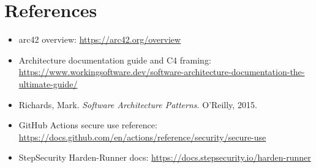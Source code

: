 \documentclass[10pt, a4paper]{article}
\begin{document}
\section*{References}

\begin{itemize}
  \item arc42 overview: \url{https://arc42.org/overview}

  \item Architecture documentation guide and C4 framing:\\
        \url{https://www.workingsoftware.dev/software-architecture-documentation-the-ultimate-guide/}

  \item Richards, Mark. \textit{Software Architecture Patterns}. O'Reilly, 2015.

  \item GitHub Actions secure use reference:\\
        \url{https://docs.github.com/en/actions/reference/security/secure-use}


  \item StepSecurity Harden-Runner docs: \url{https://docs.stepsecurity.io/harden-runner}
\end{itemize}

\end{document}
